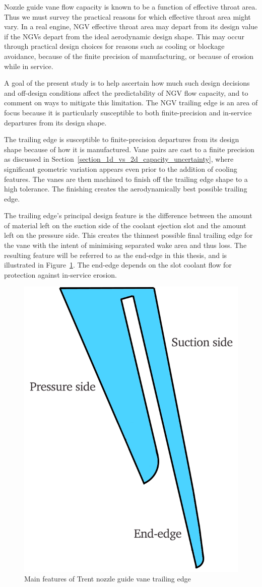 \documentclass[a4paper, 11pt, oneside]{report}
\begin{document}
Nozzle guide vane flow capacity is known to be a function of effective throat area. Thus we must survey the practical reasons for which effective throat area might vary. In a real engine, NGV effective throat area may depart from its design value if the NGVs depart from the ideal aerodynamic design shape. This may occur through practical design choices for reasons such as cooling or blockage avoidance, because of the finite precision of manufacturing, or because of erosion while in service. 

A goal of the present study is to help ascertain how much such design decisions and off-design conditions affect the predictability of NGV flow capacity, and to comment on ways to mitigate this limitation. The NGV trailing edge is an area of focus because it is particularly susceptible to both finite-precision and in-service departures from its design shape. 

The trailing edge is susceptible to finite-precision departures from its design shape because of how it is manufactured. Vane pairs are cast to a finite precision as discussed in Section~\ref{section_1d_vs_2d_capacity_uncertainty}, where significant geometric variation appears even prior to the addition of cooling features. The vanes are then machined to finish off the trailing edge shape to a high tolerance. The finishing creates the aerodynamically best possible trailing edge. 

The trailing edge's principal design feature is the difference between the amount of material left on the suction side of the coolant ejection slot and the amount left on the pressure side. This creates the thinnest possible final trailing edge for the vane with the intent of minimising separated wake area and thus loss. The resulting feature will be referred to as the end-edge in this thesis, and is illustrated in Figure~\ref{fig:te_features_labelled}. The end-edge depends on the slot coolant flow for protection against in-service erosion. 

\begin{figure}[H]
      \centering
      \includegraphics[width=.45\textwidth]{figs/te_features_labelled.png}
      \caption{Main features of Trent nozzle guide vane trailing edge}
      \label{fig:te_features_labelled}
\end{figure}
\end{document}
